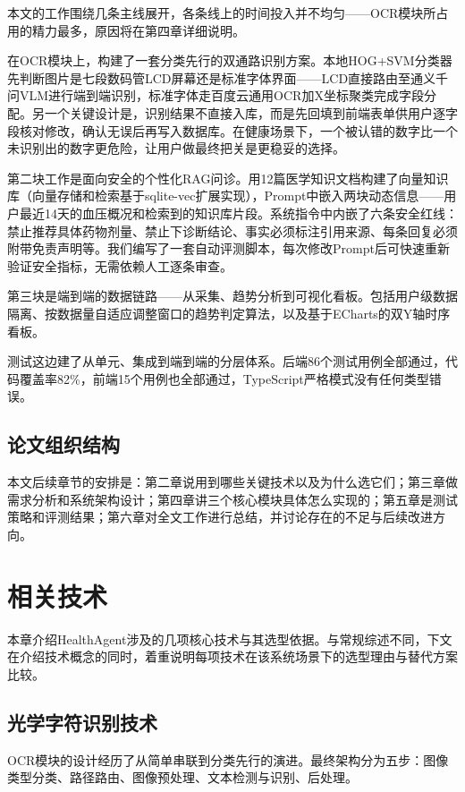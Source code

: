 \documentclass[zihao=-4,a4paper]{ctexart}
\begin{document}
本文的工作围绕几条主线展开，各条线上的时间投入并不均匀——OCR模块所占用的精力最多，原因将在第四章详细说明。

在OCR模块上，构建了一套分类先行的双通路识别方案。本地HOG+SVM分类器先判断图片是七段数码管LCD屏幕还是标准字体界面——LCD直接路由至通义千问VLM进行端到端识别，标准字体走百度云通用OCR加X坐标聚类完成字段分配。另一个关键设计是，识别结果不直接入库，而是先回填到前端表单供用户逐字段核对修改，确认无误后再写入数据库。在健康场景下，一个被认错的数字比一个未识别出的数字更危险，让用户做最终把关是更稳妥的选择。

第二块工作是面向安全的个性化RAG问诊。用12篇医学知识文档构建了向量知识库（向量存储和检索基于sqlite-vec扩展实现），Prompt中嵌入两块动态信息——用户最近14天的血压概况和检索到的知识库片段。系统指令中内嵌了六条安全红线：禁止推荐具体药物剂量、禁止下诊断结论、事实必须标注引用来源、每条回复必须附带免责声明等。我们编写了一套自动评测脚本，每次修改Prompt后可快速重新验证安全指标，无需依赖人工逐条审查。

第三块是端到端的数据链路——从采集、趋势分析到可视化看板。包括用户级数据隔离、按数据量自适应调整窗口的趋势判定算法，以及基于ECharts的双Y轴时序看板。

测试这边建了从单元、集成到端到端的分层体系。后端86个测试用例全部通过，代码覆盖率82\%，前端15个用例也全部通过，TypeScript严格模式没有任何类型错误。

\subsection{论文组织结构}

本文后续章节的安排是：第二章说用到哪些关键技术以及为什么选它们；第三章做需求分析和系统架构设计；第四章讲三个核心模块具体怎么实现的；第五章是测试策略和评测结果；第六章对全文工作进行总结，并讨论存在的不足与后续改进方向。

\newpage
\section{相关技术}

本章介绍HealthAgent涉及的几项核心技术与其选型依据。与常规综述不同，下文在介绍技术概念的同时，着重说明每项技术在该系统场景下的选型理由与替代方案比较。

\subsection{光学字符识别技术}

OCR模块的设计经历了从简单串联到分类先行的演进。最终架构分为五步：图像类型分类、路径路由、图像预处理、文本检测与识别、后处理。
\end{document}
